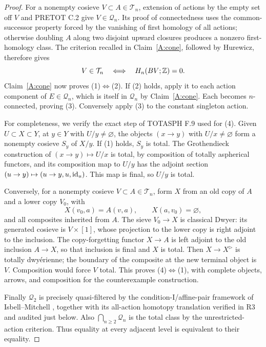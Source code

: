 \begin{proof}
For a nonempty cosieve $V\subset A\in\mathcal T_n$, extension of actions by the empty set off $V$ and PRETOT C.2 give $V\in\mathcal Q_n$. Its proof of connectedness uses the common-successor property forced by the vanishing of first homology of all actions; otherwise doubling $A$ along two disjoint upward closures produces a nonzero first-homology class. The criterion recalled in Claim~\ref{A:cone}, followed by Hurewicz, therefore gives
\[
 V\in\mathcal T_n\quad\Longleftrightarrow\quad H_n(BV;\mathbb Z)=0.
\]
Claim~\ref{A:cone} now proves (1)$\Leftrightarrow$(2). If (2) holds, apply it to each action component of $E\in\mathcal Q_n$, which is itself in $\mathcal Q_n$ by Claim~\ref{A:cone}. Each becomes $n$-connected, proving (3). Conversely apply (3) to the constant singleton action.

For completeness, we verify the exact step of TOTASPH F.9 used for (4). Given $U\subset X\subset Y$, at $y\in Y$ with $U/y\ne\varnothing$, the objects $(x\to y)$ with $U/x\ne\varnothing$ form a nonempty cosieve $S_y$ of $X/y$. If (1) holds, $S_y$ is total. The Grothendieck construction of $(x\to y)\mapsto U/x$ is total, by composition of totally aspherical functors, and its composition map to $U/y$ has the adjoint section $(u\to y)\mapsto(u\to y,u,\mathrm{id}_u)$. This map is final, so $U/y$ is total.

Conversely, for a nonempty cosieve $V\subset A\in\mathcal T_n$, form $X$ from an old copy of $A$ and a lower copy $V_0$, with
\[
 X(v_0,a)=A(v,a),\qquad X(a,v_0)=\varnothing,
\]
and all composites inherited from $A$. The sieve $V_0\to X$ is classical Dwyer: its generated cosieve is $V\times[1]$, whose projection to the lower copy is right adjoint to the inclusion. The copy-forgetting functor $X\to A$ is left adjoint to the old inclusion $A\to X$, so that inclusion is final and $X$ is total. Then $X\to X^{\triangleright}$ is totally dwy\'erienne; the boundary of the composite at the new terminal object is $V$. Composition would force $V$ total. This proves (4)$\Leftrightarrow$(1), with complete objects, arrows, and composition for the counterexample construction.

Finally $\mathcal Q_2$ is precisely quasi-filtered by the condition-I/affine-pair framework of Isbell--Mitchell \citep[Lemmas 2.1--2.2 and Proposition 2.3]{FAIsbellMitchell1976}, together with its all-action homotopy translation verified in R3 and audited just below. Also $\bigcap_{n\geq2}\mathcal Q_n$ is the total class by the unrestricted-action criterion. Thus equality at every adjacent level is equivalent to their equality.


\end{proof}
